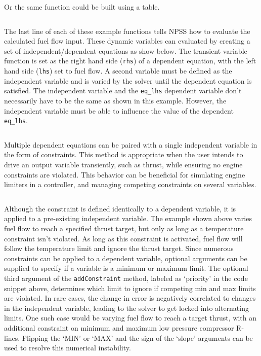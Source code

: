\documentclass[heading.tex]{subfiles}
\begin{document}
Or the same function could be built using a table. 
 
 \begin{adjustwidth}{-1cm}{-1cm}
 \inputminted[]{c++}{code/rampTb}
 \end{adjustwidth} 

The last line of each of these example functions tells NPSS how to evaluate the calculated fuel flow input.
These dynamic variables can evaluated by creating a set of independent/dependent equations as show below.
The transient variable function is set as the right hand side (\texttt{rhs}) of a dependent equation,
with the left hand side (\texttt{lhs}) set to fuel flow. 
A second variable must be defined as the independent variable and is varied by the solver until the dependent
equation is satisfied.
The independent variable and the \texttt{eq\_lhs} dependent variable don't necessarily have to be the same
as shown in this example. However, the independent variable must be able to influence the
value of the dependent \texttt{eq\_lhs}.

 \begin{adjustwidth}{1cm}{-1cm}
 \inputminted[]{c++}{code/solverSetup}
 \end{adjustwidth} 


Multiple dependent equations can be paired with a single independent variable in the form of constraints.
This method is appropriate when the user intends to drive an output variable transiently,
such as thrust, while ensuring no engine constraints are violated.
This behavior can be beneficial for simulating engine limiters in a controller, and managing 
competing constraints on several variables.
 
 \begin{adjustwidth}{1cm}{-1cm}
 \inputminted[]{c++}{code/constraintSetup}
 \end{adjustwidth} 
 
Although the constraint is defined identically to a dependent variable, it is applied to a pre-existing independent variable.
The example shown above varies fuel flow to reach a specified thrust target, but only as long as a temperature constraint isn't violated.
As long as this constraint is activated, fuel flow will follow the temperature limit and ignore the thrust target.
Since numerous constraints can be applied to a dependent variable,
optional arguments can be supplied to specify if a variable is a minimum or maximum limit.
The optional third argument of the \texttt{addConstraint} method, labeled as `priority' in the code snippet above,
determines which limit to ignore if competing min and max limits are violated.
In rare cases, the change in error is negatively correlated to changes in the independent variable,
leading to the solver to get locked into alternating limits. One such case would be varying fuel flow to reach a target thrust,
with an additional constraint on minimum and maximum low pressure compressor R-lines.
Flipping the `MIN' or `MAX' and the sign of the `slope' arguments can be used to resolve this numerical instability.
\end{document}
